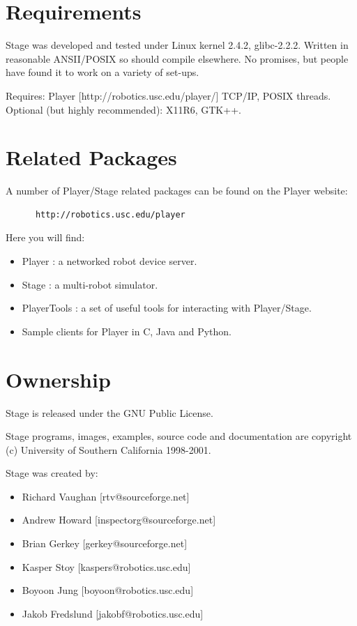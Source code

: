 \documentclass[11pt]{report}
\begin{document}
  \section{Requirements}

    Stage was developed and tested under Linux kernel 2.4.2,
    glibc-2.2.2.  Written in reasonable ANSII/POSIX so should compile
    elsewhere. No promises, but people have found it to work on a
    variety of set-ups.

    Requires: Player [http://robotics.usc.edu/player/]
              TCP/IP, POSIX threads.
	Optional (but highly recommended): X11R6, GTK++.
  
  \section{Related Packages}

    A number of Player/Stage related packages can be found on the 
    Player website:
      \begin{verbatim}
      http://robotics.usc.edu/player
      \end{verbatim}
    Here you will find:
      \begin{itemize}
      \item Player : a networked robot device server.
      \item Stage : a multi-robot simulator.
      \item PlayerTools : a set of useful tools for interacting with
            Player/Stage.
      \item Sample clients for Player in C, Java and Python.
      \end{itemize}

  \section{Ownership}

    \noindent Stage is released under the GNU Public License.

    \noindent Stage programs, images, examples, source code and documentation are
    copyright (c) University of Southern California 1998-2001.

    \noindent Stage was created by:
      \begin{itemize}
      \item[] Richard Vaughan [rtv@sourceforge.net]
      \item[] Andrew Howard [inspectorg@sourceforge.net]
      \item[] Brian Gerkey [gerkey@sourceforge.net]
      \item[] Kasper Stoy [kaspers@robotics.usc.edu]
      \item[] Boyoon Jung [boyoon@robotics.usc.edu]
      \item[] Jakob Fredslund [jakobf@robotics.usc.edu]
      \end{itemize}
\end{document}
